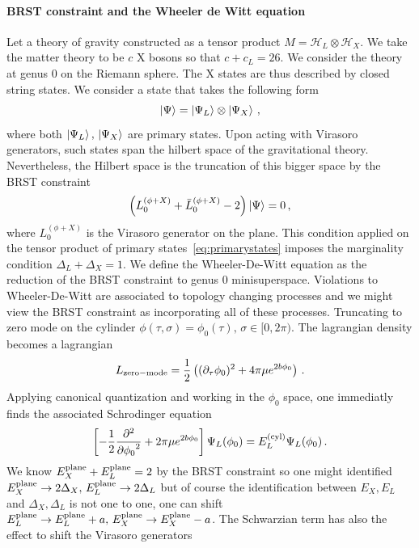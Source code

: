 \documentclass[a4paper]{article}
\begin{document}
\paragraph{BRST constraint and the Wheeler de Witt equation}
Let a theory of gravity constructed as a tensor product $M=\mathcal{H}_L \otimes \mathcal{H}_X $. We take the matter theory to be $c$ X bosons so that $c+c_L=26$. We consider the theory at genus 0 on the Riemann sphere. The X states are thus described by closed string states.  We consider a state that takes the following form 
\begin{equation}\label{eq:primarystates}
  \ket{\Psi} = \ket{\Psi_L} \otimes \ket{\Psi_X}\,,
\end{equation}
where both $\ket{\Psi_L},\,\ket{\Psi_X}$ are primary states. Upon acting with Virasoro generators, such states span the hilbert space of the gravitational theory. Nevertheless, the Hilbert space is the truncation of this bigger space by the BRST constraint
\begin{equation}
  \left(L_0^{(\phi +X)}+\bar{L}_0^{(\phi+X)}-2\right)\ket{\Psi}=0\,,
\end{equation}
where $L_0^{(\phi +X)}$ is the Virasoro generator on the plane. This condition applied on the tensor product of primary states~\eqref{eq:primarystates} imposes the marginality condition $\Delta_L +\Delta_X =1$.
We define the Wheeler-De-Witt equation as the reduction of the BRST constraint to genus $0$ minisuperspace. Violations to Wheeler-De-Witt are associated to topology changing processes and we might view the BRST constraint as incorporating all of these processes. Truncating to zero mode on the cylinder $\phi(\tau,\sigma) = \phi_0(\tau),\, \sigma \in [0,2\pi)$. The lagrangian density becomes a lagrangian
\begin{equation}
  L_{\rm zero-mode} = \frac{1}{2}\left((\partial_\tau \phi_0)^2 + 4\pi \mu e^{2b \phi_0}\right)\,.
\end{equation}
Applying canonical quantization and working in the $\phi_0$ space, one immediatly finds the associated Schrodinger equation
\begin{equation}\label{eq:Schrodinger}
 \left[-\frac{1}{2}\frac{\partial^2}{\partial{\phi_0}^2}+2\pi \mu e^{2b\phi_0}\right]\Psi_L(\phi_0)=E^{(\rm cyl)}_L \Psi_L(\phi_0)\,.
\end{equation}
We know $E^{\rm plane}_X+E^{\rm plane}_L =2$ by the BRST constraint so one might identified $E_X^{\rm plane}\to2\Delta_X,\,E^{\rm plane}_L\to 2\Delta_L$ but of course the identification between $E_X,E_L$ and $\Delta_X,\Delta_L$ is not one to one, one can shift $E^{\rm plane}_L \to E^{\rm plane}_L +a,\, E^{\rm plane}_X \to E^{\rm plane}_X -a$. The Schwarzian term has also the effect to shift the Virasoro generators
\end{document}
